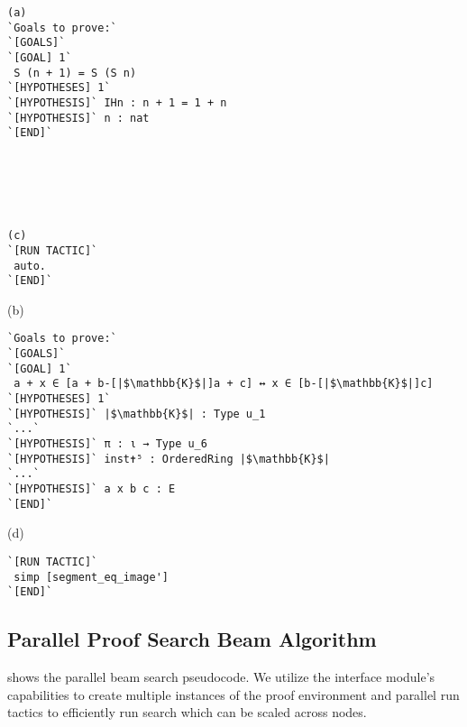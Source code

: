 \begin{figure*}[ht]
\begin{mdframed}[roundcorner=5pt]
\begin{minipage}{0.5\linewidth}
\begin{verbatim}
(a)
`Goals to prove:`
`[GOALS]`
`[GOAL] 1`
 S (n + 1) = S (S n)
`[HYPOTHESES] 1`
`[HYPOTHESIS]` IHn : n + 1 = 1 + n
`[HYPOTHESIS]` n : nat
`[END]`
\end{verbatim}
\begin{verbatim}





(c)
`[RUN TACTIC]`
 auto.
`[END]`
\end{verbatim}
\end{minipage}
\begin{minipage}{0.5\linewidth}
(b)
\begin{verbatim}
`Goals to prove:`
`[GOALS]`
`[GOAL] 1`
 a + x ∈ [a + b-[|$\mathbb{K}$|]a + c] ↔ x ∈ [b-[|$\mathbb{K}$|]c]
`[HYPOTHESES] 1`
`[HYPOTHESIS]` |$\mathbb{K}$| : Type u_1
`...`
`[HYPOTHESIS]` π : ι → Type u_6
`[HYPOTHESIS]` inst✝⁵ : OrderedRing |$\mathbb{K}$|
`...`
`[HYPOTHESIS]` a x b c : E
`[END]`
\end{verbatim}
(d)
\begin{verbatim}
`[RUN TACTIC]`
 simp [segment_eq_image']
`[END]`
\end{verbatim}
\end{minipage}
\end{mdframed}
\caption{Prompt format for training the proof step generation model. (a) shows the prompt format for \coq\;, (b) shows the prompt format for \lean{}, (c) shows the response format used for \coq, and (d) shows the response format used for \lean{}. We adopted a format similar to the one used in COPRA \citep{thakur2024incontext} but without any error context. It is important to note that we do not mention any information about the domain or ITP assistant in the prompt. The prompt format is the same for both languages.}
\label{fig:prompt-format}
\end{figure*}


\subsection{Parallel Proof Search Beam Algorithm}
\label{app:parallel-proof-search}

 shows the parallel beam search pseudocode. We utilize the interface module's capabilities to create multiple instances of the proof environment and parallel run tactics to efficiently run search which can be scaled across nodes.

